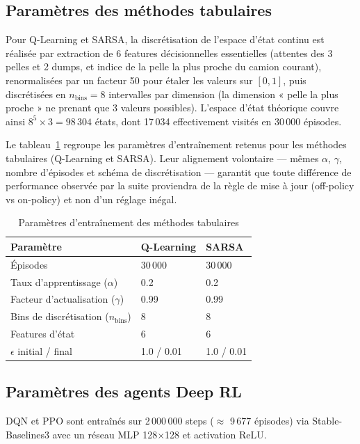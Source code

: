 \documentclass[11pt,a4paper]{report}
\begin{document}
\subsection{Paramètres des méthodes tabulaires}

Pour Q-Learning et SARSA, la discrétisation de l'espace d'état continu est réalisée par extraction de 6 features décisionnelles essentielles (attentes des 3 pelles et 2 dumps, et indice de la pelle la plus proche du camion courant), renormalisées par un facteur 50 pour étaler les valeurs sur $[0, 1]$, puis discrétisées en $n_{\text{bins}} = 8$ intervalles par dimension (la dimension « pelle la plus proche » ne prenant que 3 valeurs possibles).  L'espace d'état théorique couvre ainsi $8^5 \times 3 = 98\,304$ états, dont 17\,034 effectivement visités en 30\,000 épisodes.

Le tableau~\ref{tab:params-tabulaires} regroupe les param\`etres d'entra\^inement retenus pour les m\'ethodes tabulaires (Q-Learning et SARSA). Leur alignement volontaire --- m\^emes $\alpha$, $\gamma$, nombre d'\'episodes et sch\'ema de discr\'etisation --- garantit que toute diff\'erence de performance observ\'ee par la suite proviendra de la r\`egle de mise \`a jour (off-policy vs on-policy) et non d'un r\'eglage in\'egal.

\begin{table}[H]
\centering
\caption{Paramètres d'entraînement des méthodes tabulaires}
\label{tab:params-tabulaires}
\begin{tabular}{lll}
\toprule
\textbf{Paramètre} & \textbf{Q-Learning} & \textbf{SARSA} \\
\midrule
Épisodes & 30\,000 & 30\,000 \\
Taux d'apprentissage ($\alpha$) & 0.2 & 0.2 \\
Facteur d'actualisation ($\gamma$) & 0.99 & 0.99 \\
Bins de discrétisation ($n_{\text{bins}}$) & 8 & 8 \\
Features d'état & 6 & 6 \\
$\epsilon$ initial / final & 1.0 / 0.01 & 1.0 / 0.01 \\
\bottomrule
\end{tabular}
\end{table}

\subsection{Paramètres des agents Deep RL}

DQN et PPO sont entraînés sur 2\,000\,000 steps ($\approx$ 9\,677 épisodes) via Stable-Baselines3 avec un réseau MLP 128$\times$128 et activation ReLU.
\end{document}

